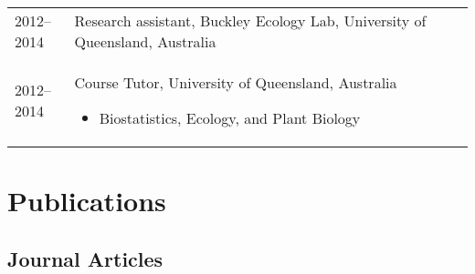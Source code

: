 \documentclass[a4paper]{article}
\begin{document}
\begin{tabular}{p{0.13\linewidth} p{0.87\linewidth}}
2012--2014 & Research assistant, Buckley Ecology Lab, University of Queensland, Australia \\

2012--2014 & Course Tutor, University of Queensland, Australia
\begin{itemize} 
\item Biostatistics, Ecology, and Plant Biology
\end{itemize} \\

\end{tabular}


\section*{Publications}

\subsection*{Journal Articles}
\end{document}
